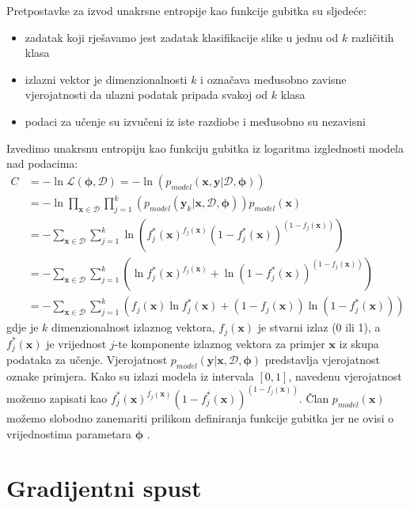 \documentclass[times, utf8, diplomski, numeric]{fer}
\begin{document}
Pretpostavke za izvod unakrsne entropije kao funkcije gubitka su sljedeće:
\begin{itemize}
 \item zadatak koji rješavamo jest zadatak klasifikacije slike u jednu od $k$ različitih klasa
 \item izlazni vektor je dimenzionalnosti $k$ i označava međusobno zavisne vjerojatnosti da ulazni podatak pripada svakoj od $k$ klasa
 \item podaci za učenje su izvučeni iz iste razdiobe i međusobno su nezavisni
\end{itemize}

\noindent Izvedimo unakrsnu entropiju kao funkciju gubitka iz logaritma izglednosti modela nad podacima:
\begin{align}
 C &= - \ln \mathcal{L}(\boldsymbol{\phi}, \mathcal{D}) = - \ln (p_{model}(\mathbf{x}, \mathbf{y} | \mathcal{D}, \boldsymbol{\phi})) \nonumber \\
 &= - \ln \prod_{\mathbf{x} \in \mathcal{D}} \prod_{j=1}^{k} (p_{model}(\mathbf{y}_k | \mathbf{x}, \mathcal{D}, \boldsymbol{\phi})) p_{model}(\mathbf{x})\nonumber \\
 &= - \sum_{\mathbf{x} \in \mathcal{D}} \sum_{j=1}^{k} \ln (f_j^*(\mathbf{x})^{f_j(\mathbf{x})}  (1 - f_j^*(\mathbf{x}))^{(1 - f_j(\mathbf{x}))}) \nonumber \\
 &= - \sum_{\mathbf{x} \in \mathcal{D}} \sum_{j=1}^{k} (\ln f_j^*(\mathbf{x})^{f_j(\mathbf{x})} + \ln (1 - f_j^*(\mathbf{x}))^{(1 - f_j(\mathbf{x}))}) \nonumber \\
 &= - \sum_{\mathbf{x} \in \mathcal{D}} \sum_{j=1}^{k} (f_j(\mathbf{x}) \ln f_j^*(\mathbf{x}) + (1 - f_j(\mathbf{x})) \ln (1 - f_j^*(\mathbf{x}))) \label{eq:neg_log_likelihood}
\end{align}
gdje je $k$ dimenzionalnost izlaznog vektora, $f_j(\mathbf{x})$ je stvarni izlaz (0 ili 1), a $f_j^*(\mathbf{x})$ je vrijednost $j$-te komponente izlaznog vektora za primjer $\mathbf{x}$ iz skupa podataka za učenje.
Vjerojatnost $p_{model}( \mathbf{y} | \mathbf{x},\mathcal{D}, \boldsymbol{\phi})$ predstavlja vjerojatnost oznake primjera. Kako su izlazi modela iz intervala $\left[ 0, 1\right]$,
navedenu vjerojatnost možemo zapisati kao $f_j^*(\mathbf{x})^{f_j(\mathbf{x})}  (1 - f_j^*(\mathbf{x}))^{(1 - f_j(\mathbf{x}))}$.
Član $p_{model}(\mathbf{x})$ možemo slobodno zanemariti prilikom definiranja funkcije gubitka jer ne ovisi o vrijednostima parametara $\boldsymbol{\phi}$ \citep{seminar:rela}.

\section{Gradijentni spust}
\end{document}
